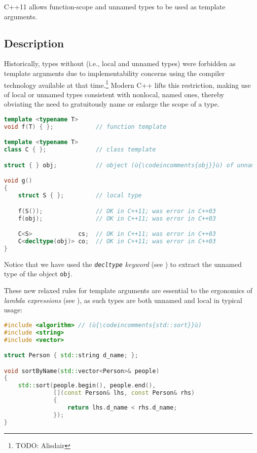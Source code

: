 

C++11 allows function-scope and unnamed types to be used as template arguments.

\subsection[Description]{Description}\label{description}

Historically, types without  (i.e., local and unnamed
types) were forbidden as template arguments due to implementability
concerns using the compiler technology available at that
time.{\cprotect\footnote{TODO: Alisdair}} Modern C++ lifts this
restriction, making use of local or unnamed types consistent with
nonlocal, named ones, thereby obviating the need to gratuitously name
or enlarge the scope of a type.

\begin{lstlisting}[language=C++]
template <typename T>
void f(T) { };            // function template

template <typename T>
class C { };              // class template

struct { } obj;           // object (ù{\codeincomments{obj}}ù) of unnamed C++ type

void g()
{
    struct S { };         // local type

    f(S());               // OK in C++11; was error in C++03
    f(obj);               // OK in C++11; was error in C++03

    C<S>             cs;  // OK in C++11; was error in C++03
    C<decltype(obj)> co;  // OK in C++11; was error in C++03
}
\end{lstlisting}

\noindent Notice that we have used the \emph{\lstinline!decltype!
keyword} (see ) to extract the unnamed type of the object \lstinline!obj!.

These new relaxed rules for template arguments are essential to the
ergonomics of \emph{lambda expressions} (see ), as such types are both
unnamed and local in typical usage:

\begin{lstlisting}[language=C++]
#include <algorithm> // (ù{\codeincomments{std::sort}}ù)
#include <string>
#include <vector>

struct Person { std::string d_name; };

void sortByName(std::vector<Person>& people)
{
    std::sort(people.begin(), people.end(),
              [](const Person& lhs, const Person& rhs)
              {
                  return lhs.d_name < rhs.d_name;
              });
}
\end{lstlisting}

